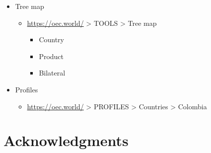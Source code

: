 \documentclass[
  ignorenonframetext,
]{beamer}
\providecommand{\tightlist}{%
  \setlength{\itemsep}{0pt}\setlength{\parskip}{0pt}}\usepackage{longtable,booktabs,array}
\begin{document}
\begin{frame}{}
\label{section-16}
\begin{itemize}
\item
  Tree map

  \begin{itemize}
  \item
    \url{https://oec.world/} \textgreater{} TOOLS \textgreater{} Tree
    map

    \begin{itemize}
    \tightlist
    \item
      Country
    \item
      Product
    \item
      Bilateral
    \end{itemize}
  \end{itemize}
\item
  Profiles

  \begin{itemize}
  \tightlist
  \item
    \url{https://oec.world/} \textgreater{} PROFILES \textgreater{}
    Countries \textgreater{} Colombia
  \end{itemize}
\end{itemize}
\end{frame}

\section{Acknowledgments}\label{acknowledgments}
\end{document}
